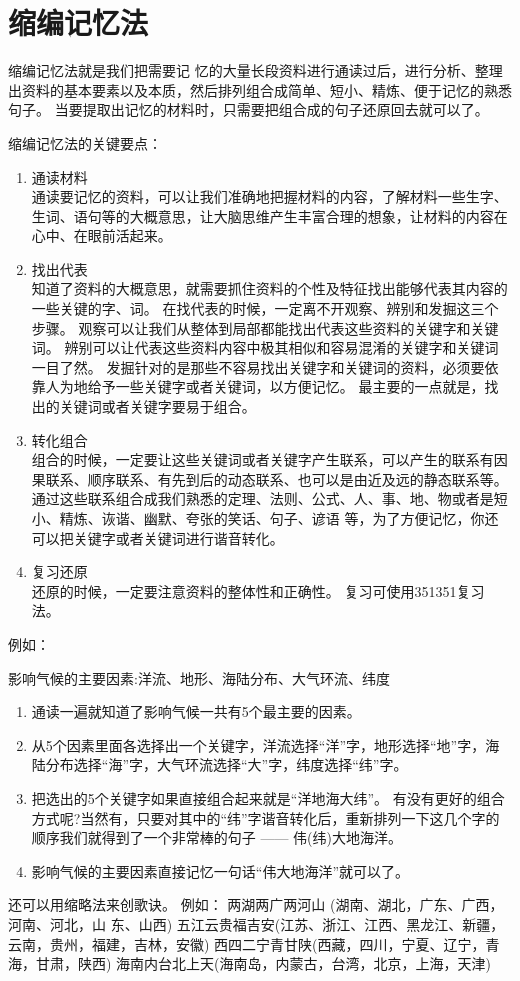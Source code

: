 
\chapter{缩编记忆法}

缩编记忆法就是我们把需要记 忆的大量长段资料进行通读过后，进行分析、整理出资料的基本要素以及本质，然后排列组合成简单、短小、精炼、便于记忆的熟悉句子。 当要提取出记忆的材料时，只需要把组合成的句子还原回去就可以了。


缩编记忆法的关键要点：
\begin{enumerate}
\item 通读材料\\
  通读要记忆的资料，可以让我们准确地把握材料的内容，了解材料一些生字、生词、语句等的大概意思，让大脑思维产生丰富合理的想象，让材料的内容在心中、在眼前活起来。
\item 找出代表\\
  知道了资料的大概意思，就需要抓住资料的个性及特征找出能够代表其内容的一些关键的字、词。
  在找代表的时候，一定离不开观察、辨别和发掘这三个步骤。
  观察可以让我们从整体到局部都能找出代表这些资料的关键字和关键词。
  辨别可以让代表这些资料内容中极其相似和容易混淆的关键字和关键词一目了然。
  发掘针对的是那些不容易找出关键字和关键词的资料，必须要依靠人为地给予一些关键字或者关键词，以方便记忆。
  最主要的一点就是，找出的关键词或者关键字要易于组合。
\item 转化组合\\
  组合的时候，一定要让这些关键词或者关键字产生联系，可以产生的联系有因果联系、顺序联系、有先到后的动态联系、也可以是由近及远的静态联系等。
  通过这些联系组合成我们熟悉的定理、法则、公式、人、事、地、物或者是短小、精炼、诙谐、幽默、夸张的笑话、句子、谚语 等，为了方便记忆，你还可以把关键字或者关键词进行谐音转化。
\item 复习还原\\
  还原的时候，一定要注意资料的整体性和正确性。
  复习可使用351351复习法。
\end{enumerate}



例如：
\begin{tcolorbox}
  影响气候的主要因素:洋流、地形、海陆分布、大气环流、纬度
\end{tcolorbox}

\begin{enumerate}
\item 通读一遍就知道了影响气候一共有5个最主要的因素。
\item 从5个因素里面各选择出一个关键字，洋流选择“洋”字，地形选择“地”字，海陆分布选择“海”字，大气环流选择“大”字，纬度选择“纬”字。
\item 把选出的5个关键字如果直接组合起来就是“洋地海大纬”。
  有没有更好的组合方式呢?当然有，只要对其中的“纬”字谐音转化后，重新排列一下这几个字的顺序我们就得到了一个非常棒的句子 —— 伟(纬)大地海洋。
\item 影响气候的主要因素直接记忆一句话“伟大地海洋”就可以了。
\end{enumerate}

还可以用缩略法来创歌诀。
例如：
两湖两广两河山 (湖南、湖北，广东、广西，河南、河北，山 东、山西)
五江云贵福吉安(江苏、浙江、江西、黑龙江、新疆，云南，贵州，福建，吉林，安徽)
西四二宁青甘陕(西藏，四川，宁夏、辽宁，青海，甘肃，陕西)
海南内台北上天(海南岛，内蒙古，台湾，北京，上海，天津)

